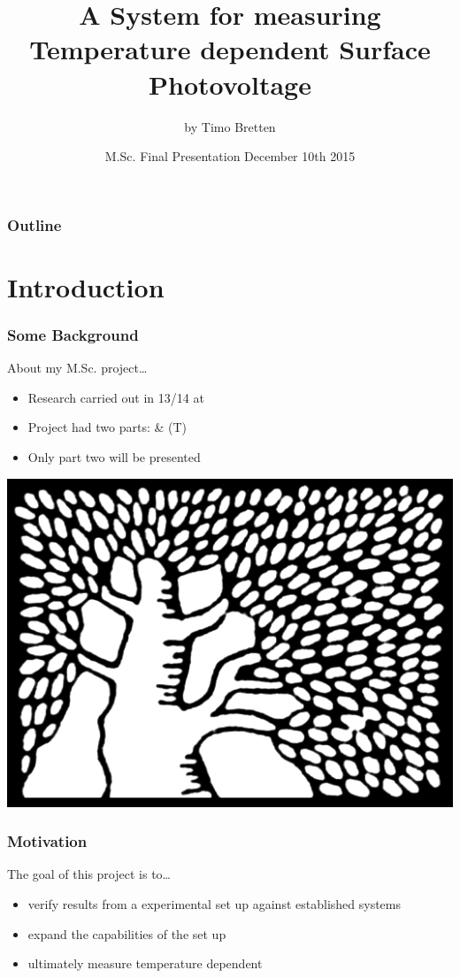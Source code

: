 \documentclass{beamer}
\title[\authorname{} M.Sc. Presentation]{A System for measuring Temperature dependent Surface Photovoltage}
\subtitle{by Timo Bretten}
\institute[\univname]{\univname}
\date[December 10th 2015]{M.Sc. Final Presentation December 10th 2015}
\begin{document}
\begin{frame}
  \titlepage
\end{frame}

\begin{frame}
  \frametitle{Outline}
  \tableofcontents
\end{frame}

\section{Introduction}
\begin{frame}
\frametitle{Some Background}
\begin{block}{About my M.Sc. project\dots}
\begin{minipage}{0.55\linewidth}
	\begin{itemize}
		\item Research carried out in 13/14 at \deptname{}
		\item Project had two parts: \pvdf{} \& \spv{}(T)
		\item Only part two will be presented
	\end{itemize}
\end{minipage}
\hfill
\begin{minipage}{0.4\linewidth}
\centering
	\includegraphics[width=1\linewidth]{./figs/logos/weiz}
\end{minipage}
\end{block}\end{frame}

\begin{frame}
\frametitle{Motivation}
\begin{block}{The goal of this project is to\dots}
	\begin{itemize}
		\item verify results from a  experimental set up against established systems
		\item expand the capabilities of the  set up
		\item ultimately measure temperature dependent \spv{}
	\end{itemize}
\end{block}\end{frame}
\end{document}
